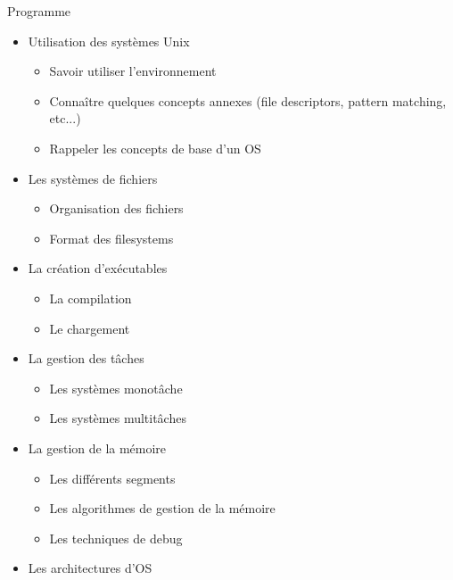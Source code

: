 %
%
%


\begin{frame}[fragile=singleslide]{Programme}
  \begin{itemize} 
  \item Utilisation des systèmes Unix
    \begin{itemize}
    \item Savoir utiliser l'environnement
    \item  Connaître  quelques  concepts  annexes  (file  descriptors,
      pattern matching, etc...)
    \item Rappeler les concepts de base d'un OS
    \end{itemize}
  \item Les systèmes de fichiers
    \begin{itemize}
      \item Organisation des fichiers
      \item Format des filesystems
    \end{itemize}
  \item La création d'exécutables
    \begin{itemize} 
    \item La compilation
    \item Le chargement
    \end{itemize}
  \item La gestion des tâches
    \begin{itemize}
    \item Les systèmes monotâche
    \item Les systèmes multitâches 
    \end{itemize}
  \item La gestion de la mémoire
    \begin{itemize}
    \item Les différents segments
    \item Les algorithmes de gestion de la mémoire
    \item Les techniques de debug
    \end{itemize}
  \item Les architectures d'OS
  \end{itemize}
\end{frame}
